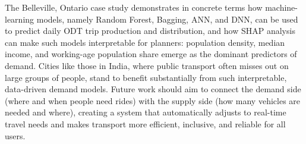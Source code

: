 \documentclass[12pt]{article}
\begin{document}
The Belleville, Ontario case study demonstrates in concrete terms how
machine-learning models, namely Random Forest, Bagging, ANN, and DNN, can be used to
predict daily ODT trip production and distribution, and how SHAP analysis can make
such models interpretable for planners: population density, median income, and
working-age population share emerge as the dominant predictors of demand. Cities
like those in India, where public transport often misses out on large groups of
people, stand to benefit substantially from such interpretable, data-driven demand
models. Future work should aim to connect the demand side (where and when people
need rides) with the supply side (how many vehicles are needed and where), creating
a system that automatically adjusts to real-time travel needs and makes transport
more efficient, inclusive, and reliable for all users.
\end{document}
